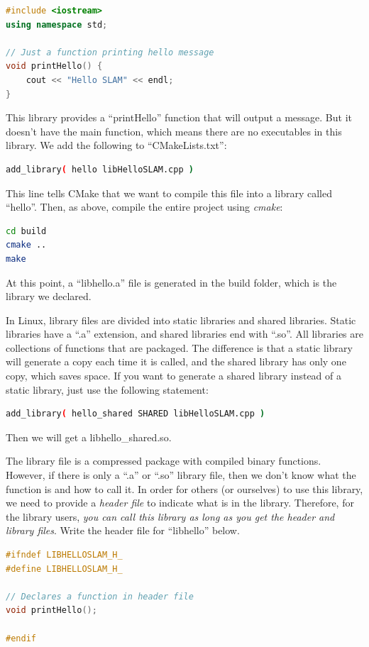 \begin{lstlisting}[language=c++,caption=slambook2/ch2/libHelloSLAM.cpp]
#include <iostream>
using namespace std;

// Just a function printing hello message
void printHello() {
    cout << "Hello SLAM" << endl;
}
\end{lstlisting}
This library provides a ``printHello'' function that will output a message. But it doesn't have the main function, which means there are no executables in this library. We add the following to ``CMakeLists.txt'':
\begin{lstlisting}[language=sh,caption=slambook2/ch2/CMakeLists.txt]
add_library( hello libHelloSLAM.cpp )
\end{lstlisting}
This line tells CMake that we want to compile this file into a library called ``hello''. Then, as above, compile the entire project using \textit{cmake}:
\begin{lstlisting}[language=sh,caption=Terminal input]
cd build
cmake ..
make
\end{lstlisting}
At this point, a ``libhello.a'' file is generated in the build folder, which is the library we declared.

In Linux, library files are divided into static libraries and shared libraries. Static libraries have a ``.a'' extension, and shared libraries end with ``.so''. All libraries are collections of functions that are packaged. The difference is that a static library will generate a copy each time it is called, and the shared library has only one copy, which saves space. If you want to generate a shared library instead of a static library, just use the following statement:

\begin{lstlisting}[language=sh,caption=slambook2/ch2/CMakeLists.txt]
add_library( hello_shared SHARED libHelloSLAM.cpp )
\end{lstlisting}
Then we will get a libhello\_shared.so.

The library file is a compressed package with compiled binary functions. However, if there is only a ``.a'' or ``.so'' library file, then we don't know what the function is and how to call it. In order for others (or ourselves) to use this library, we need to provide a \textit{header file} to indicate what is in the library. Therefore, for the library users, \textit{you can call this library as long as you get the header and library files}. Write the header file for ``libhello'' below.

\begin{lstlisting}[language=c++,caption=slambook2/ch2/libHelloSLAM.h]
#ifndef LIBHELLOSLAM_H_
#define LIBHELLOSLAM_H_

// Declares a function in header file
void printHello();

#endif
\end{lstlisting}

